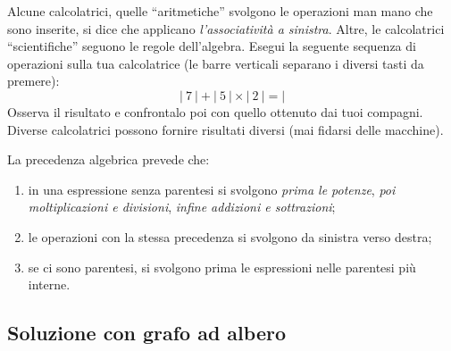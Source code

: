 
\begin{osservazione}{}{} 
Alcune calcolatrici, quelle ``aritmetiche'' svolgono le 
operazioni man mano che sono inserite, si dice che applicano 
\emph{l'associatività a sinistra}. Altre, le calcolatrici ``scientifiche'' 
seguono le regole dell'algebra. 
Esegui la seguente sequenza di operazioni sulla tua calcolatrice 
(le barre verticali separano i diversi tasti da premere):
\[|~7~|+|~5~|\times|~2~|=|\]
Osserva il risultato e confrontalo poi con quello ottenuto dai tuoi 
compagni. 
Diverse calcolatrici possono fornire risultati diversi (mai fidarsi delle
macchine).
\end{osservazione}

La precedenza algebrica prevede che:

\begin{enumerate} [nosep]
\item in una espressione senza parentesi si svolgono 
\emph{prima le potenze}, 
\emph{poi moltiplicazioni e divisioni}, 
\emph{infine addizioni e sottrazioni};
\item le operazioni con la stessa precedenza si svolgono da sinistra verso 
destra;
\item se ci sono parentesi, si svolgono prima le espressioni nelle parentesi 
più interne. 
\end{enumerate}

\subsection{Soluzione con grafo ad albero}

